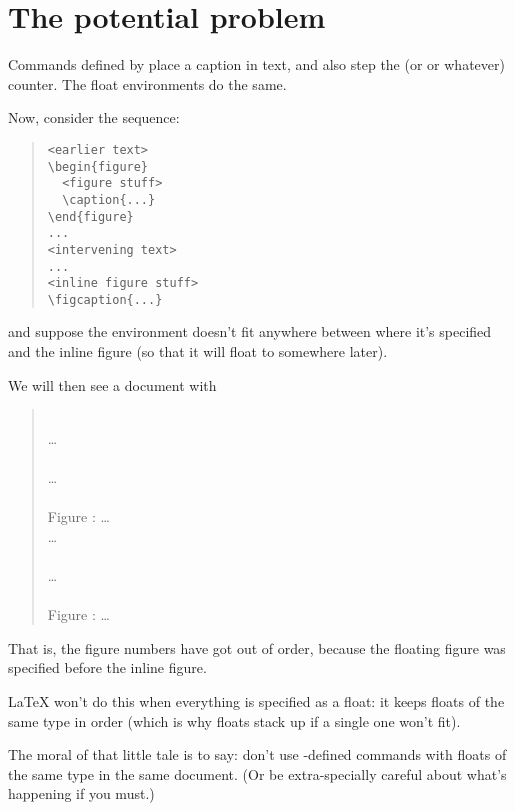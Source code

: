 \documentclass[a4paper]{article}
\begin{document}
\section{The potential problem}

Commands defined by  place a caption in text, and also step the
 (or  or whatever) counter.  The float
environments do the same.

Now, consider the sequence:
\begin{quote}
\begin{verbatim}
<earlier text>
\begin{figure}
  <figure stuff>
  \caption{...}
\end{figure}
...
<intervening text>
...
<inline figure stuff>
\figcaption{...}
\end{verbatim}
\end{quote}
and suppose the  environment doesn't fit anywhere
between where it's specified and the inline figure (so that it will
float to somewhere later).

We will then see a document with
\begin{quote}
\\
\dots\\
\\
\dots\\
\\
Figure : \dots\\
\dots\\
\\
\dots\\
\\
Figure : \dots
\end{quote}
That is, the figure numbers have got out of order, because the
floating figure was specified before the inline figure.

\LaTeX{} won't do this when everything is specified as a float: it
keeps floats of the same type in order (which is why floats stack up
if a single one won't fit).

The moral of that little tale is to say: don't use
-defined commands with floats of the same type in the same
document.  (Or be extra-specially careful about what's happening if
you must.)
\end{document}
